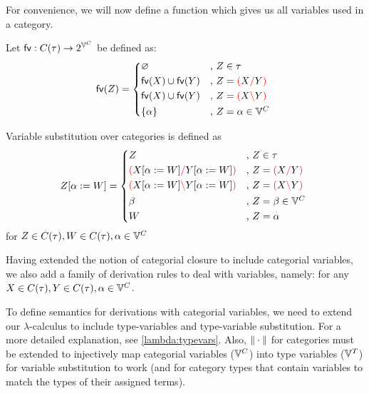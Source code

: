 \documentclass[main.tex]{subfiles}
\begin{document}
For convenience, we will now define a function which gives us all variables
used in a category.
\begin{defn}
    Let $\mathsf{fv} : C(\tau) \rightarrow 2^{\mathbb{V}^{C}}$ be defined as:
    \[
        \fv{Z} =
        \begin{cases*}
            \varnothing& , $Z \in \tau$ \\
            \fv{X} \cup \fv{Y}& , $Z = \lp X \rc Y \rp$ \\
            \fv{X} \cup \fv{Y}& , $Z = \lp X \lc Y \rp$ \\
            \{ \alpha \}& , $Z = \alpha \in \cvars$ \\
        \end{cases*}
    \]
\end{defn}
\begin{defn}
    Variable substitution over categories is defined as
    \[
        \subst{Z}{\alpha}{W} =
        \begin{cases*}
            Z& , $Z \in \tau$ \\
            \lp \subst{X}{\alpha}{W} \rc \subst{Y}{\alpha}{W} \rp& , $Z = \lp X \rc Y \rp$ \\
            \lp \subst{X}{\alpha}{W} \lc \subst{Y}{\alpha}{W} \rp& , $Z = \lp X \lc Y \rp$ \\
            \beta& , $Z = \beta \in \cvars$ \\
            W& , $Z = \alpha$ \\
        \end{cases*}
    \]
    for $Z \in C(\tau), W \in C(\tau), \alpha \in \mathbb{V}^{C}$
\end{defn}

Having extended the notion of categorial closure to include categorial variables,
we also add a family of derivation rules to deal with variables, namely:
for any $X \in C(\tau), Y \in C(\tau), \alpha \in \mathbb{V}^{C}$.

To define semantics for derivations with categorial variables, we need to extend
our $\lambda$-calculus to include type-variables and type-variable substitution.
For a more detailed explanation, see \cref{lambda:typevars}.
Also, $\|\cdot\|$ for categories must be extended to injectively map categorial
variables ($\mathbb{V}^{C}$) into type variables ($\mathbb{V}^{T}$) for variable substitution
to work (and for category types that contain variables to match the types of
their assigned terms).
\end{document}
